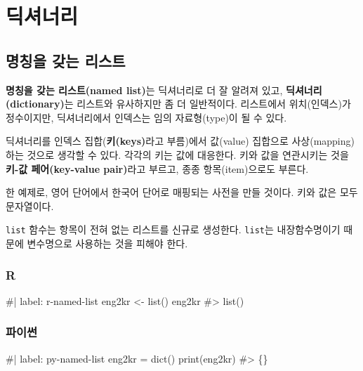 \documentclass[
  letterpaper,
]{book}
\newenvironment{Shaded}{\begin{snugshade}}{\end{snugshade}}
\newcommand{\NormalTok}[1]{\textcolor[rgb]{0.00,0.23,0.31}{#1}}
\begin{document}
\chapter{딕셔너리}\label{named-list}

   
 

\section{명칭을 갖는 리스트}\label{r-named-list}

\textbf{명칭을 갖는 리스트(named list)}는 딕셔너리로 더 잘 알려져 있고,
\textbf{딕셔너리(dictionary)}는 리스트와 유사하지만 좀 더 일반적이다.
리스트에서 위치(인덱스)가 정수이지만, 딕셔너리에서 인덱스는 임의
자료형(type)이 될 수 있다.

딕셔너리를 인덱스 집합(\textbf{키(keys)}라고 부름)에서 값(value)
집합으로 사상(mapping)하는 것으로 생각할 수 있다. 각각의 키는 값에
대응한다. 키와 값을 연관시키는 것을 \textbf{키-값 페어(key-value
pair)}라고 부르고, 종종 항목(item)으로도 부른다.

한 예제로, 영어 단어에서 한국어 단어로 매핑되는 사전을 만들 것이다. 키와
값은 모두 문자열이다.

\texttt{list} 함수는 항목이 전혀 없는 리스트를 신규로 생성한다.
\texttt{list}는 내장함수명이기 때문에 변수명으로 사용하는 것을 피해야
한다.

\subsection{R}

\begin{Shaded}
\begin{Highlighting}[]
\NormalTok{\#| label: r{-}named{-}list}
\NormalTok{eng2kr \textless{}{-} list()}
\NormalTok{eng2kr}
\NormalTok{\#\textgreater{} list()}
\end{Highlighting}
\end{Shaded}

\subsection{파이썬}

\begin{Shaded}
\begin{Highlighting}[]
\NormalTok{\#| label: py{-}named{-}list}
\NormalTok{eng2kr = dict()}
\NormalTok{print(eng2kr)}
\NormalTok{\#\textgreater{} \{\}}
\end{Highlighting}
\end{Shaded}
\end{document}
